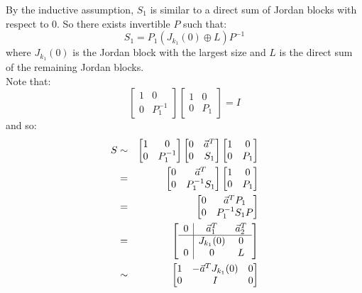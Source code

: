 \documentclass[letterpaper,12pt,fleqn]{article}
\newcommand{\va}{\vec{a}}
\begin{document}
\begin{theproof}
\begin{description}
    By the inductive assumption, $S_1$ is similar to a direct sum of Jordan blocks with
    respect to 0. So there exists invertible $P$ such that:
    \[S_1=P_1(J_{k_1}(0)\oplus L)P^{-1}\]
    where $J_{k_1}(0)$ is the Jordan block with the largest size and $L$ is the direct
    sum of the remaining Jordan blocks. \\
    Note that:
    \[\begin{bmatrix} 1 & 0 \\ 0 & P_1^{-1} \end{bmatrix}
    \begin{bmatrix} 1 & 0 \\ 0 & P_1 \end{bmatrix}=I\]
    and so:
    \begin{eqnarray*}
      S &\sim& \begin{bmatrix} 1 & 0 \\ 0 & P_1^{-1} \end{bmatrix}
      \begin{bmatrix} 0 & \va^T \\ 0 & S_1 \end{bmatrix}
      \begin{bmatrix} 1 & 0 \\ 0 & P_1 \end{bmatrix} \\
      &=& \begin{bmatrix}
        0 & \va^T \\
        0 & P_1^{-1}S_1
      \end{bmatrix}
      \begin{bmatrix} 1 & 0 \\ 0 & P_1 \end{bmatrix} \\
      &=& \begin{bmatrix} 0 & \va^TP_1 \\ 0 & P_1^{-1}S_1P \end{bmatrix} \\
      &=& \left[\begin{array}{c|cc}
          0 & \va_1^T & \va_2^T \\
          \hline
          & J_{k_1}(0) & 0 \\
          0 & 0 & L
        \end{array}\right] \\
      &\sim& \begin{bmatrix}
        1 & -\va^TJ_{k_1}(0) & 0 \\
        0 & I & 0 \\

\end{bmatrix}
\end{eqnarray*}
\end{description}
\end{theproof}
\end{document}
